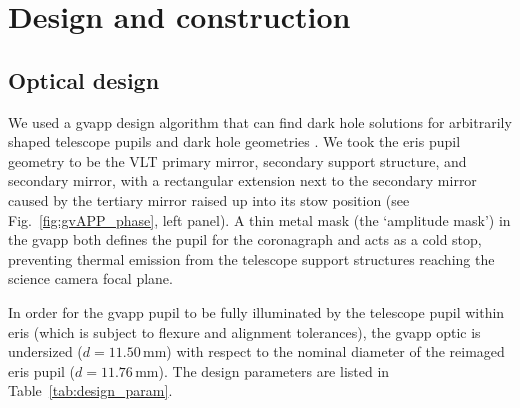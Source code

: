 \documentclass{aa}
\begin{document}
\section{Design and construction}
\label{sec:phase_design}

\subsection{Optical design}

We used a \ac{gvapp} design algorithm that can find dark hole solutions for arbitrarily shaped telescope pupils and dark hole geometries \citep{2021ApOpt..60D..52D}.
%
We took the \ac{eris} pupil geometry to be the VLT primary mirror, secondary support structure, and secondary mirror, with a rectangular extension next to the secondary mirror caused by the tertiary mirror raised up into its stow position (see Fig.~\ref{fig:gvAPP_phase}, left panel).
%
A thin metal mask (the `amplitude mask') in the \ac{gvapp} both defines the pupil for the coronagraph and acts as a cold stop, preventing thermal emission from the telescope support structures reaching the science camera focal plane.

In order for the \ac{gvapp} pupil to be fully illuminated by the  telescope pupil within \ac{eris} (which is subject to flexure and alignment tolerances), the \ac{gvapp} optic is undersized ($d=11.50$\,mm) with respect to the nominal diameter of the reimaged \ac{eris} pupil ($d=11.76\,$mm).
%
The design parameters are listed in Table~\ref{tab:design_param}.
\end{document}
